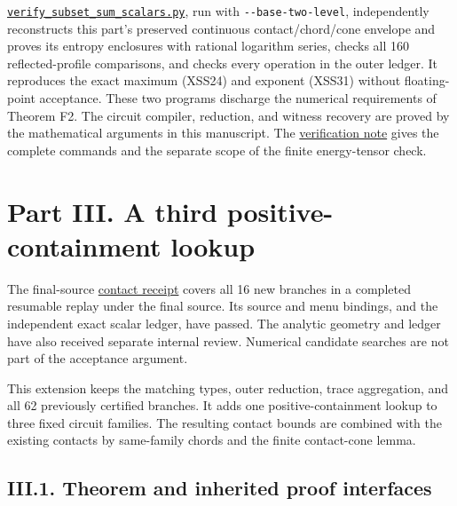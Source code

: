\href{https://github.com/icekylinx/algorithm-frontier/blob/main/tools/verify_subset_sum_scalars.py}{\texttt{verify\_subset\_sum\_scalars.py}}, run with \texttt{-\/-base-two-level}, independently reconstructs this part's preserved continuous contact/chord/cone envelope and proves its entropy enclosures with rational logarithm series, checks all 160 reflected-profile comparisons, and checks every operation in the outer ledger. It reproduces the exact maximum (XSS24) and exponent (XSS31) without floating-point acceptance. These two programs discharge the numerical requirements of Theorem F2. The circuit compiler, reduction, and witness recovery are proved by the mathematical arguments in this manuscript. The \href{https://github.com/icekylinx/algorithm-frontier/blob/main/problems/subset-sum-fast-deterministic/verify/README.md}{verification note} gives the complete commands and the separate scope of the finite energy-tensor check.

\hypertarget{af-a9ec399514-part-iii.-a-third-positive-containment-lookup}{%
\section{Part III. A third positive-containment lookup}\label{af-a9ec399514-part-iii.-a-third-positive-containment-lookup}}

The final-source \href{https://github.com/icekylinx/algorithm-frontier/blob/main/problems/subset-sum-fast-deterministic/verify/third_receipt.json}{contact receipt} covers all 16 new branches in a completed resumable replay under the final source. Its source and menu bindings, and the independent exact scalar ledger, have passed. The analytic geometry and ledger have also received separate internal review. Numerical candidate searches are not part of the acceptance argument.

This extension keeps the matching types, outer reduction, trace aggregation, and all 62 previously certified branches. It adds one positive-containment lookup to three fixed circuit families. The resulting contact bounds are combined with the existing contacts by same-family chords and the finite contact-cone lemma.

\hypertarget{af-a9ec399514-iii.1.-theorem-and-inherited-proof-interfaces}{%
\subsection{III.1. Theorem and inherited proof interfaces}\label{af-a9ec399514-iii.1.-theorem-and-inherited-proof-interfaces}}

